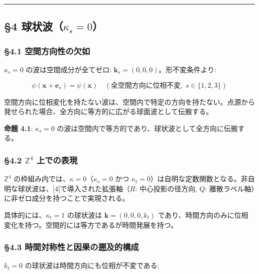 \documentclass[
  a4paper,11pt]{ltjsarticle}
\theoremstyle{definition}
\theoremstyle{remark}
\begin{document}
\begin{center}\rule{0.5\linewidth}{0.5pt}\end{center}

\subsection{\texorpdfstring{§4
球状波（\(\kappa_s = 0\)）}{§4 球状波（\textbackslash kappa\_s = 0）}}\label{ux7403ux72b6ux6ce2kappa_s-0}

\subsubsection{§4.1
空間方向性の欠如}\label{ux7a7aux9593ux65b9ux5411ux6027ux306eux6b20ux5982}

\(\kappa_s = 0\) の波は空間成分が全てゼロ:
\(\mathbf{k}_s = (0, 0, 0)\)。形不変条件より:

\[\psi(\mathbf{x} + \mathbf{e}_s) = \psi(\mathbf{x}) \quad (\text{全空間方向に位相不変},\; s \in \{1, 2, 3\})\]

空間方向に位相変化を持たない波は、空間内で特定の方向を持たない。点源から発せられた場合、全方向に等方的に広がる球面波として伝搬する。

\textbf{命題 4.1}: \(\kappa_s = 0\)
の波は空間内で等方的であり、球状波として全方向に伝搬する。

\subsubsection{\texorpdfstring{§4.2 \(\mathbb{Z}^4\)
上での表現}{§4.2 \textbackslash mathbb\{Z\}\^{}4 上での表現}}\label{mathbbz4-ux4e0aux3067ux306eux8868ux73fe}

\(\mathbb{Z}^4\) の枠組み内では、\(\kappa = 0\)（\(\kappa_s = 0\) かつ
\(\kappa_t = 0\)）は自明な定数関数となる。非自明な球状波は、{[}4{]}で導入された拡張軸（\(R\):
中心投影の径方向, \(Q\):
離散ラベル軸）に非ゼロ成分を持つことで実現される。

具体的には、\(\kappa_t = 1\) の球状波は \(\mathbf{k} = (0, 0, 0, k_t)\)
であり、時間方向のみに位相変化を持つ。空間的には等方であるが時間発展を持つ。

\subsubsection{§4.3
時間対称性と因果の遡及的構成}\label{ux6642ux9593ux5bfeux79f0ux6027ux3068ux56e0ux679cux306eux9061ux53caux7684ux69cbux6210}

\(k_t = 0\) の球状波は時間方向にも位相が不変である:
\end{document}
